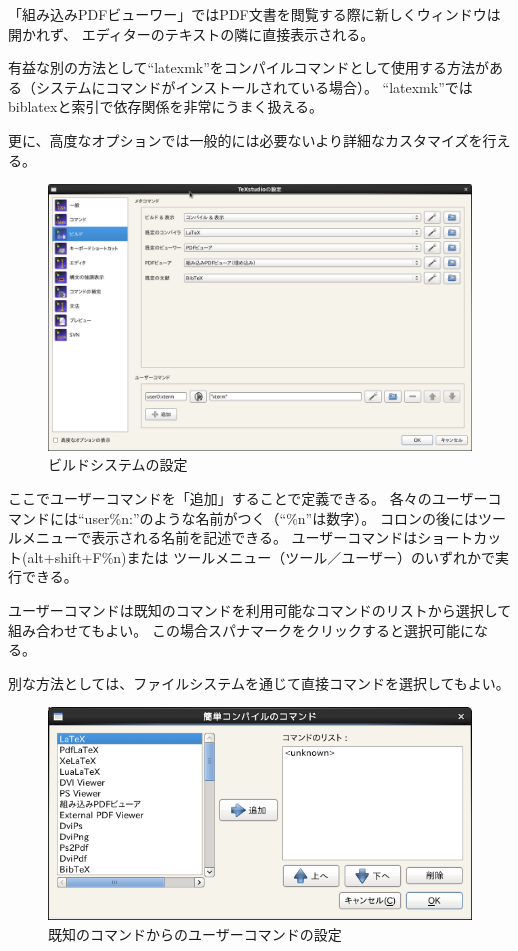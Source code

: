 「組み込みPDFビューワー」ではPDF文書を閲覧する際に新しくウィンドウは開かれず、
エディターのテキストの隣に直接表示される。

有益な別の方法として``latexmk''をコンパイルコマンドとして使用する方法がある（システムにコマンドがインストールされている場合）。
``latexmk''ではbiblatexと索引で依存関係を非常にうまく扱える。

更に、高度なオプションでは一般的には必要ないより詳細なカスタマイズを行える。

\begin{figure}[H]
  \centering
  \includegraphics[width=.8\linewidth]{configure_build.png}
  \caption{ビルドシステムの設定}
\end{figure}

ここでユーザーコマンドを「追加」することで定義できる。
各々のユーザーコマンドには``user\%n:''のような名前がつく（``\%n''は数字）。
コロンの後にはツールメニューで表示される名前を記述できる。
ユーザーコマンドはショートカット(alt+shift+F\%n)または
ツールメニュー（ツール／ユーザー）のいずれかで実行できる。

ユーザーコマンドは既知のコマンドを利用可能なコマンドのリストから選択して組み合わせてもよい。
この場合スパナマークをクリックすると選択可能になる。

別な方法としては、ファイルシステムを通じて直接コマンドを選択してもよい。

\begin{figure}[H]
  \centering
  \includegraphics[width=.8\linewidth]{doc21.png}
  \caption{既知のコマンドからのユーザーコマンドの設定}
\end{figure}


